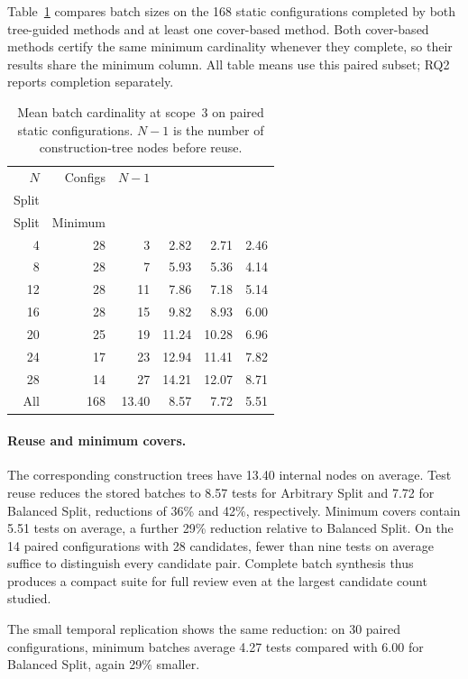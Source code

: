 \documentclass[runningheads]{llncs}
\newcommand{\methodname}[1]{\textup{\textsf{#1}}}
\newcommand{\arbitrarysplit}{\methodname{Arbitrary Split}}
\newcommand{\balancedsplit}{\methodname{Balanced Split}}
\newcommand{\methodheading}[2]{\shortstack{\methodname{#1}\\\methodname{#2}}}
\begin{document}
Table~\ref{tab:batch-cardinality} compares batch sizes on the 168 static
configurations completed by both tree-guided methods and at least one
cover-based method. Both cover-based methods certify the same minimum
cardinality whenever they complete, so their results share the minimum
column. All table means use this paired subset; RQ2 reports completion
separately.

\begin{table}[t]
\centering
\caption{Mean batch cardinality at scope~3 on paired static configurations.
$N-1$ is the number of construction-tree nodes before reuse.}
\label{tab:batch-cardinality}
\small
\setlength{\tabcolsep}{5pt}
\begin{tabular}{rrrrrr}
\toprule
$N$ & Configs & $N-1$ & \methodheading{Arbitrary}{Split} &
    \methodheading{Balanced}{Split} & Minimum \\
\midrule
4  & 28 &  3 &  2.82 &  2.71 & 2.46 \\
8  & 28 &  7 &  5.93 &  5.36 & 4.14 \\
12 & 28 & 11 &  7.86 &  7.18 & 5.14 \\
16 & 28 & 15 &  9.82 &  8.93 & 6.00 \\
20 & 25 & 19 & 11.24 & 10.28 & 6.96 \\
24 & 17 & 23 & 12.94 & 11.41 & 7.82 \\
28 & 14 & 27 & 14.21 & 12.07 & 8.71 \\
\midrule
All & 168 & 13.40 & 8.57 & 7.72 & 5.51 \\
\bottomrule
\end{tabular}
\end{table}

\paragraph{Reuse and minimum covers.}
The corresponding construction trees have 13.40 internal nodes on average.
Test reuse reduces the stored batches to 8.57 tests for \arbitrarysplit{} and
7.72 for \balancedsplit{}, reductions of 36\% and 42\%, respectively.
Minimum covers contain 5.51 tests on average, a further 29\% reduction
relative to \balancedsplit{}. On the 14 paired configurations with 28
candidates, fewer than nine tests on average suffice to distinguish every
candidate pair. Complete batch synthesis thus produces a compact suite for
full review even at the largest candidate count studied.

The small temporal replication shows the same reduction: on 30 paired
configurations, minimum batches average 4.27 tests compared with 6.00 for
\balancedsplit{}, again 29\% smaller.
\end{document}
